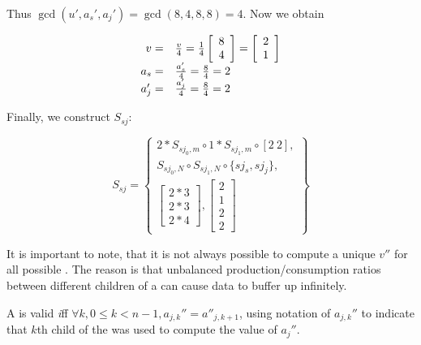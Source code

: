 Thus $\gcd(u', a_s', a_j') = \gcd(8,4,8,8) = 4$.  Now we obtain

\begin{displaymath}
\begin{array}{rl}
v = & {v \over 4} = {1 \over 4} \left[
\begin{array}{c}
8 \\ 4
\end{array}
\right] =  \left[
\begin{array}{c}
2 \\ 1
\end{array}
\right]\\
a_s = & {a_s' \over 4} = {8 \over 4} = 2 \\
a_j' = & {a_j' \over 4} = {8 \over 4} = 2
\end{array}
\end{displaymath}

Finally, we construct $S_{sj}$:

\begin{displaymath}
S_{sj} = \left\{
\begin{array}{c}
2 * S_{sj_0, m} \circ 1 * S_{sj_1, m} \circ [2\ 2], \\
S_{sj_0, N} \circ S_{sj_1, N} \circ \{sj_s, sj_j\}, \\
\left[
\begin{array}{c}
2 * 3 \\ 2 * 3 \\ 2 * 4
\end{array}
\right], \left[
\begin{array}{c}
2 \\ 1 \\ 2 \\ 2
\end{array}\right]
\end{array} \right\}
\end{displaymath}

It is important to note, that it is not always possible to compute
a unique $v''$ for all possible {\splitjoins}. The reason is that
unbalanced production/consumption ratios between different
children of a {\splitjoin} can cause data to buffer up infinitely.

\begin{definition} A {\splitjoin} is valid
{\emph iff} $\forall k, 0 \le k < n-1, a_{j,k}'' = a''_{j,k+1}$,
using notation of $a_{j,k}''$ to indicate that $k$th child of the
{\splitjoin} was used to compute the value of $a_j''$.
\end{definition}

